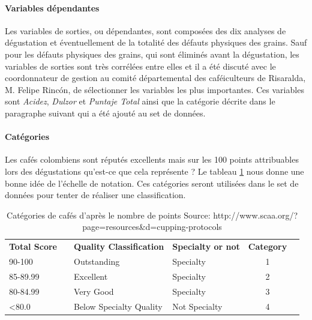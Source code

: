 \paragraph{Variables dépendantes\label{VarDep}} Les variables de sorties, ou dépendantes, sont composées des dix analyses de dégustation et éventuellement de la totalité des défauts physiques des grains. Sauf pour les défauts physiques des grains, qui sont éliminés avant la dégustation, les variables de sorties sont très corrélées entre elles et il a été discuté avec le coordonnateur de gestion au comité départemental des caféiculteurs de Risaralda, M. Felipe Rincón, de sélectionner les variables les plus importantes. Ces variables sont \textit{Acidez}, \textit{Dulzor} et \textit{Puntaje Total} ainsi que la catégorie décrite dans le paragraphe suivant qui a été ajouté au set de données.  

\paragraph{Catégories}
Les cafés colombiens sont réputés excellents mais sur les 100 points attribuables lors des dégustations qu'est-ce que cela représente ? Le tableau \ref{categoriesCafe} nous donne une bonne idée de l'échelle de notation. Ces catégories seront utilisées dans le set de données pour tenter de réaliser une classification. 
\begin{table}[H]
	\centering
	\caption{Catégories de cafés d'après le nombre de points \newline Source: http://www.scaa.org/?page=resources\&d=cupping-protocols \label{categoriesCafe}}
	\begin{tabular}{llllcl}
		\textbf{Total Score}   &  & \textbf{Quality Classification}   & \textbf{Specialty or not}  & \textbf{Category} \\
		
		90-100        &  & Outstanding              & Specialty         &  1                    \\
		85-89.99      &  & Excellent                & Specialty         &  2                    \\
		80-84.99      &  & Very Good                & Specialty         &  3                    \\
		\textless80.0 &  & Below Specialty Quality & Not Specialty     &  4                   
	\end{tabular}
\end{table}



